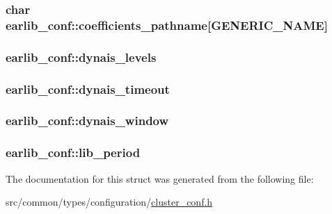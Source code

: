 \subsubsection[{\texorpdfstring{coefficients\+\_\+pathname}{coefficients_pathname}}]{\setlength{\rightskip}{0pt plus 5cm}char earlib\+\_\+conf\+::coefficients\+\_\+pathname\mbox{[}{\bf G\+E\+N\+E\+R\+I\+C\+\_\+\+N\+A\+ME}\mbox{]}}\hypertarget{structearlib__conf_a7d50f565148d113852156a44fd99edbd}{}\label{structearlib__conf_a7d50f565148d113852156a44fd99edbd}
\subsubsection[{\texorpdfstring{dynais\+\_\+levels}{dynais_levels}}]{ earlib\+\_\+conf\+::dynais\+\_\+levels}\hypertarget{structearlib__conf_a8b5712014dc86a9a08936c75b9449689}{}\label{structearlib__conf_a8b5712014dc86a9a08936c75b9449689}
\subsubsection[{\texorpdfstring{dynais\+\_\+timeout}{dynais_timeout}}]{ earlib\+\_\+conf\+::dynais\+\_\+timeout}\hypertarget{structearlib__conf_a2d78a9744ace1d5f246239c5ce30e62b}{}\label{structearlib__conf_a2d78a9744ace1d5f246239c5ce30e62b}
\subsubsection[{\texorpdfstring{dynais\+\_\+window}{dynais_window}}]{ earlib\+\_\+conf\+::dynais\+\_\+window}\hypertarget{structearlib__conf_a66bb2fa87356ed7b10a7cde1fbf915f4}{}\label{structearlib__conf_a66bb2fa87356ed7b10a7cde1fbf915f4}
\subsubsection[{\texorpdfstring{lib\+\_\+period}{lib_period}}]{ earlib\+\_\+conf\+::lib\+\_\+period}\hypertarget{structearlib__conf_ad046e8531b8e16e3d9bbd713d220441d}{}\label{structearlib__conf_ad046e8531b8e16e3d9bbd713d220441d}


The documentation for this struct was generated from the following file\+:\begin{DoxyCompactItemize}
\item 
src/common/types/configuration/\hyperlink{cluster__conf_8h}{cluster\+\_\+conf.\+h}\end{DoxyCompactItemize}
